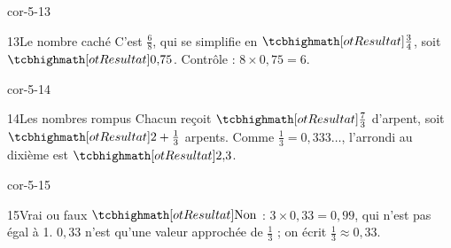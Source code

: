 \begin{blocLivre}{cor-5-13}\begin{corrige}{13}{Le nombre caché}
C’est $\frac68$, qui se simplifie en $\res{\frac34}$, soit $\res{0{,}75}$. Contrôle : $8\times0{,}75=6$.
\end{corrige}\end{blocLivre}
\begin{blocLivre}{cor-5-14}\begin{corrige}{14}{Les nombres rompus}
Chacun reçoit $\res{\frac73}$ d’arpent, soit $\res{2+\frac13}$ arpents. Comme $\frac13=0{,}333\ldots$, l’arrondi au dixième est $\res{2{,}3}$.
\end{corrige}\end{blocLivre}
\begin{blocLivre}{cor-5-15}\begin{corrige}{15}{Vrai ou faux}
$\res{\text{Non}}$ : $3\times0{,}33=0{,}99$, qui n’est pas égal à 1. $0{,}33$ n’est qu’une valeur approchée de $\frac13$ ; on écrit $\frac13\approx0{,}33$.
\end{corrige}\end{blocLivre}
